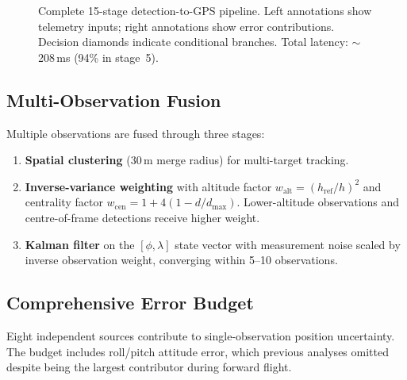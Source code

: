 \documentclass[10pt,a4paper]{article}
\begin{document}
\begin{figure}[p]
{%
}
\caption{Complete 15-stage detection-to-GPS pipeline.  Left annotations show telemetry inputs; right annotations show error contributions.  Decision diamonds indicate conditional branches.  Total latency: ${\sim}$208\,ms (94\% in stage~5).}\label{fig:pipeline-flow}
\end{figure}

\subsection{Multi-Observation Fusion}

Multiple observations are fused through three stages:

\begin{enumerate}
    \item \textbf{Spatial clustering} (30\,m merge radius) for multi-target tracking.
    \item \textbf{Inverse-variance weighting} with altitude factor $w_{\mathrm{alt}} = (h_{\mathrm{ref}}/h)^2$ and centrality factor $w_{\mathrm{cen}} = 1 + 4(1 - d/d_{\mathrm{max}})$. Lower-altitude observations and centre-of-frame detections receive higher weight.
    \item \textbf{Kalman filter} on the $[\phi, \lambda]$ state vector with measurement noise scaled by inverse observation weight, converging within 5--10 observations.
\end{enumerate}

\subsection{Comprehensive Error Budget}

Eight independent sources contribute to single-observation position uncertainty.  The budget includes roll/pitch attitude error, which previous analyses omitted despite being the largest contributor during forward flight.
\end{document}
